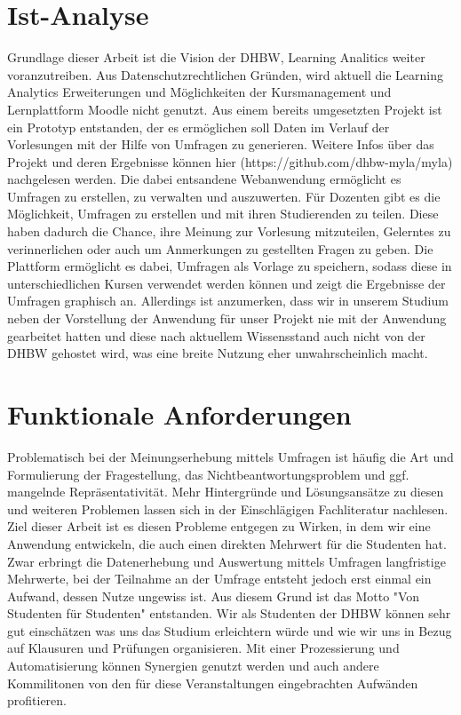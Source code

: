 \section{Ist-Analyse}
Grundlage dieser Arbeit ist die Vision der DHBW, Learning Analitics weiter voranzutreiben.
Aus Datenschutzrechtlichen Gründen, wird aktuell die Learning Analytics Erweiterungen und Möglichkeiten der Kursmanagement und Lernplattform Moodle nicht genutzt.
Aus einem bereits umgesetzten Projekt ist ein Prototyp entstanden, der es ermöglichen soll Daten im Verlauf der Vorlesungen mit der Hilfe von Umfragen zu generieren.
Weitere Infos über das Projekt und deren Ergebnisse können hier (https://github.com/dhbw-myla/myla) nachgelesen werden. 
Die dabei entsandene Webanwendung ermöglicht es Umfragen zu erstellen, zu verwalten und auszuwerten.
Für Dozenten gibt es die Möglichkeit, Umfragen zu erstellen und mit ihren Studierenden zu teilen.
Diese haben dadurch die Chance, ihre Meinung zur Vorlesung mitzuteilen, Gelerntes zu verinnerlichen oder auch um Anmerkungen zu gestellten Fragen zu geben.
Die Plattform ermöglicht es dabei, Umfragen als Vorlage zu speichern, sodass diese in unterschiedlichen Kursen verwendet werden können und zeigt die Ergebnisse der Umfragen graphisch an.
Allerdings ist anzumerken, dass wir in unserem Studium neben der Vorstellung der Anwendung für unser Projekt nie mit der Anwendung gearbeitet hatten und diese nach aktuellem Wissensstand auch nicht von der DHBW gehostet wird, was eine breite Nutzung eher unwahrscheinlich macht. 



\section{Funktionale Anforderungen} %
Problematisch bei der Meinungserhebung mittels Umfragen ist häufig die Art und Formulierung der Fragestellung, das Nichtbeantwortungsproblem und ggf. mangelnde Repräsentativität.
Mehr Hintergründe und Lösungsansätze zu diesen und weiteren Problemen lassen sich in der Einschlägigen Fachliteratur nachlesen.
Ziel dieser Arbeit ist es diesen Probleme entgegen zu Wirken, in dem wir eine Anwendung entwickeln, die auch einen direkten Mehrwert für die Studenten hat.
Zwar erbringt die Datenerhebung und Auswertung mittels Umfragen langfristige Mehrwerte, bei der Teilnahme an der Umfrage entsteht jedoch erst einmal ein Aufwand, dessen Nutze ungewiss ist.
Aus diesem Grund ist das Motto "Von Studenten für Studenten" entstanden.
Wir als Studenten der DHBW können sehr gut einschätzen was uns das Studium erleichtern würde und wie wir uns in Bezug auf Klausuren und Prüfungen organisieren.
Mit einer Prozessierung und Automatisierung können Synergien genutzt werden und auch andere Kommilitonen von den für diese Veranstaltungen eingebrachten Aufwänden profitieren. 

